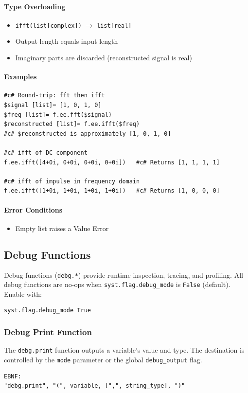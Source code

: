 \paragraph{Type Overloading}
\begin{itemize}
\item \texttt{ifft(list[complex])} $\rightarrow$ \texttt{list[real]}
\item Output length equals input length
\item Imaginary parts are discarded (reconstructed signal is real)
\end{itemize}

\paragraph{Examples}
\begin{verbatim}
#c# Round-trip: fft then ifft
$signal [list]= [1, 0, 1, 0]
$freq [list]= f.ee.fft($signal)
$reconstructed [list]= f.ee.ifft($freq)
#c# $reconstructed is approximately [1, 0, 1, 0]

#c# ifft of DC component
f.ee.ifft([4+0i, 0+0i, 0+0i, 0+0i])   #c# Returns [1, 1, 1, 1]

#c# ifft of impulse in frequency domain
f.ee.ifft([1+0i, 1+0i, 1+0i, 1+0i])   #c# Returns [1, 0, 0, 0]
\end{verbatim}

\paragraph{Error Conditions}
\begin{itemize}
\item Empty list raises a Value Error
\end{itemize}

\subsection{Debug Functions}
\label{sec:debug-functions}
Debug functions (\texttt{debg.*}) provide runtime inspection, tracing, and profiling. All debug functions are no-ops when \texttt{syst.flag.debug\_mode} is \texttt{False} (default). Enable with:
\begin{verbatim}
syst.flag.debug_mode True
\end{verbatim}

\subsubsection{Debug Print Function}
The \texttt{debg.print} function outputs a variable's value and type. The destination is controlled by the \texttt{mode} parameter or the global \texttt{debug\_output} flag.
\begin{verbatim}
EBNF:
"debg.print", "(", variable, [",", string_type], ")"
\end{verbatim}

